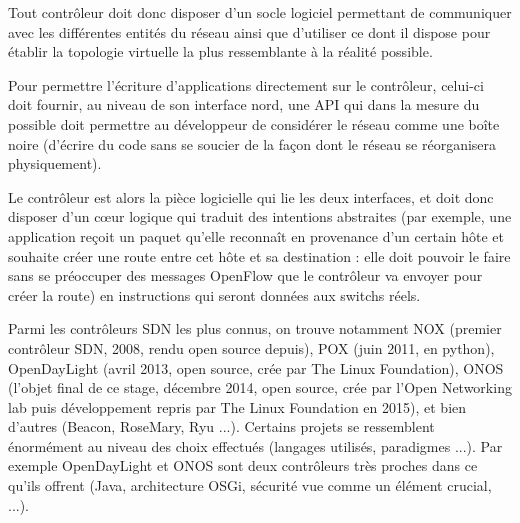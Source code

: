 Tout contrôleur doit donc disposer d'un socle logiciel permettant de communiquer avec les différentes entités du réseau ainsi que d'utiliser ce dont il dispose pour établir la topologie virtuelle la plus ressemblante à la réalité possible.

Pour permettre l'écriture d'applications directement sur le contrôleur, celui-ci doit fournir, au niveau de son interface nord, une API qui dans la mesure du possible doit permettre au développeur de considérer  le réseau comme une boîte noire (d'écrire du code sans se soucier de la façon dont le réseau se réorganisera physiquement).

Le contrôleur est alors la pièce logicielle qui lie les deux interfaces, et doit donc disposer d'un cœur logique qui traduit des intentions abstraites (par exemple, une application reçoit un paquet qu'elle reconnaît en provenance d'un certain hôte et souhaite créer une route entre cet hôte et sa destination : elle doit pouvoir le faire sans se préoccuper des messages OpenFlow que le contrôleur va envoyer pour créer la route) en instructions qui seront données aux switchs réels.

Parmi les contrôleurs SDN les plus connus, on trouve notamment NOX (premier contrôleur SDN, 2008, rendu open source depuis), POX (juin 2011, en python), OpenDayLight (avril 2013, open source, crée par The Linux Foundation), ONOS (l'objet final de ce stage, décembre 2014, open source, crée par l'Open Networking lab puis développement repris par The Linux Foundation en 2015), et bien d'autres (Beacon, RoseMary, Ryu ...). Certains projets se ressemblent énormément au niveau des choix effectués (langages utilisés, paradigmes ...). Par exemple OpenDayLight et ONOS sont deux contrôleurs très proches dans ce qu'ils offrent (Java, architecture OSGi, sécurité vue comme un élément crucial, ...).